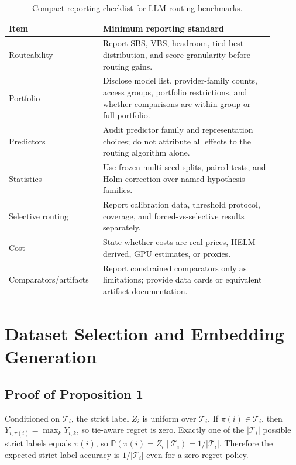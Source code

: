 \documentclass{article}
\newcommand{\tieset}{\mathcal{T}_i}
\begin{document}
\begin{table}[h]
  \caption{Compact reporting checklist for LLM routing benchmarks.}
  \label{tab:reporting}
  \centering
  \small
  \begin{tabular}{p{0.30\linewidth} p{0.60\linewidth}}
    \toprule
    Item & Minimum reporting standard \\
    \midrule
    Routeability & Report SBS, VBS, headroom, tied-best distribution, and score granularity before routing gains. \\
    Portfolio & Disclose model list, provider-family counts, access groups, portfolio restrictions, and whether comparisons are within-group or full-portfolio. \\
    Predictors & Audit predictor family and representation choices; do not attribute all effects to the routing algorithm alone. \\
    Statistics & Use frozen multi-seed splits, paired tests, and Holm correction over named hypothesis families. \\
    Selective routing & Report calibration data, threshold protocol, coverage, and forced-vs-selective results separately. \\
    Cost & State whether costs are real prices, HELM-derived, GPU estimates, or proxies. \\
    Comparators/artifacts & Report constrained comparators only as limitations; provide data cards or equivalent artifact documentation. \\
    \bottomrule
  \end{tabular}
\end{table}

\section{Dataset Selection and Embedding Generation}
\label{app:dataset-embedding}

\subsection{Proof of Proposition 1}
\label{app:strict-winner-proof}

Conditioned on $\tieset$, the strict label $Z_i$ is uniform over $\tieset$. If $\pi(i)\in \tieset$, then $Y_{i,\pi(i)}=\max_k Y_{i,k}$, so tie-aware regret is zero. Exactly one of the $|\tieset|$ possible strict labels equals $\pi(i)$, so $\mathbb{P}(\pi(i)=Z_i\mid \tieset)=1/|\tieset|$. Therefore the expected strict-label accuracy is $1/|\tieset|$ even for a zero-regret policy.
\end{document}
